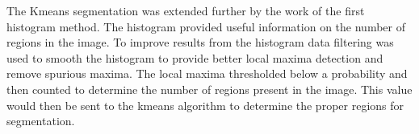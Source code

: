 \documentclass[a4paper,10pt,oneside]{article}
\begin{document}

The Kmeans segmentation was extended further by the work of the first histogram method. The histogram provided useful information on the number of regions in the image. To improve results from the histogram data filtering was used to smooth the histogram to provide better local maxima detection and remove spurious maxima. The local maxima thresholded below a probability and then counted to determine the number of regions present in the image. This value would then be sent to the kmeans algorithm to determine the proper regions for segmentation.


\end{document}
